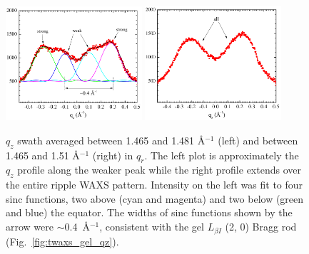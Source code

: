 \begin{figure}[htbp]
  \centering
  \includegraphics[width=0.45\textwidth]{figures/ripple/tWAXS/twaxs_weak_qz}
  \includegraphics[width=0.45\textwidth]{figures/ripple/tWAXS/twaxs_both_qz}
  \caption[$q_z$ swath averaged between 1.465 and 1.481 \AA$^{-1}$
  (left) and between 1.465 and 1.51 \AA$^{-1}$ (right) in $q_r$]
  {$q_z$ swath averaged between 1.465 and 1.481 \AA$^{-1}$
  (left) and between 1.465 and 1.51 \AA$^{-1}$ (right) in $q_r$.
  The left plot is approximately the $q_z$ profile along the weaker peak
  while the right profile extends over the entire ripple WAXS pattern.
  Intensity on the left was fit to four sinc functions, two above
  (cyan and magenta) and two below (green and blue) the equator.
  The widths of sinc functions shown by the arrow were $\sim$0.4~\AA$^{-1}$,
  consistent with the gel $L_{\beta I}$ (2, 0) Bragg rod 
  (Fig.~\ref{fig:twaxs_gel_qz}).}
  \label{fig:twaxs_qzplot}
\end{figure}  


